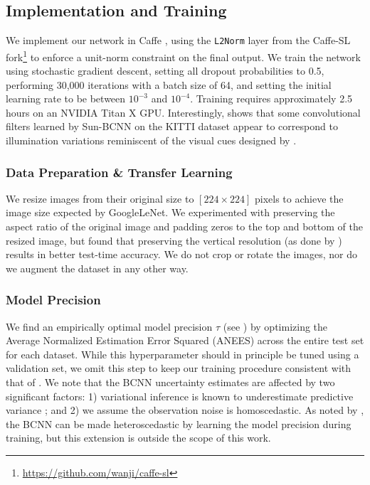 \subsection{Implementation and Training}
We implement our network in Caffe \citep{jia2014caffe}, using the \texttt{L2Norm} layer from the Caffe-SL fork\footnote{\url{https://github.com/wanji/caffe-sl}} to enforce a unit-norm constraint on the final output.
We train the network using stochastic gradient descent, setting all dropout probabilities to 0.5, performing 30,000 iterations with a batch size of 64, and setting the initial learning rate to be between $10^{-3}$ and $10^{-4}$. 
Training requires approximately 2.5 hours on an NVIDIA Titan X GPU.
Interestingly,  shows that some convolutional filters learned by Sun-BCNN on the KITTI dataset appear to correspond to illumination variations reminiscent of the visual cues designed by \citet{Lalonde2011-jw}.

\subsubsection{Data Preparation \& Transfer Learning}
We resize images from their original size to $[224 \times 224]$ pixels to achieve the image size expected by GoogleLeNet. 
We experimented with preserving the aspect ratio of the original image and padding zeros to the top and bottom of the resized image, but found that preserving the vertical resolution (as done by \citet{Ma2016-at}) results in better test-time accuracy. We do not crop or rotate the images, nor do we augment the dataset in any other way.

\subsubsection{Model Precision}
We find an empirically optimal model precision $\tau$ (see ) by optimizing the Average Normalized Estimation Error Squared (ANEES) across the entire test set for each dataset. 
While this hyperparameter should in principle be tuned using a validation set, we omit this step to keep our training procedure consistent with that of \citet{Ma2016-at}. 
We note that the BCNN uncertainty estimates are affected by two significant factors: 1) variational inference is known to underestimate predictive variance  \citep{Gal2016UncertaintyThesis}; and 2) we assume the observation noise is homoscedastic. 
As noted by \citet{Gal2016UncertaintyThesis}, the BCNN can be made heteroscedastic by learning the model precision during training, but this extension is outside the scope of this work.

